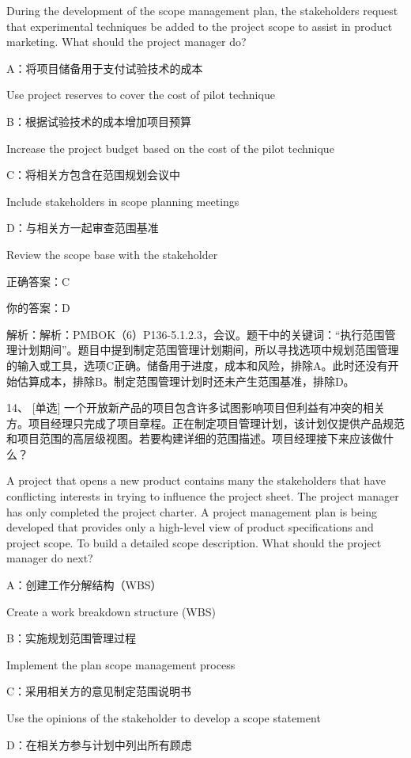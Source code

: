 During the development of the scope management plan, the stakeholders request that experimental techniques be added to the project scope to assist in product marketing. What should the project manager do?

A：将项目储备用于支付试验技术的成本

Use project reserves to cover the cost of pilot technique

B：根据试验技术的成本增加项目预算

Increase the project budget based on the cost of the pilot technique

C：将相关方包含在范围规划会议中

Include stakeholders in scope planning meetings

D：与相关方一起审查范围基准

Review the scope base with the stakeholder

正确答案：C

你的答案：D

解析：解析：PMBOK（6）P136-5.1.2.3，会议。题干中的关键词：“执行范围管理计划期间”。题目中提到制定范围管理计划期间，所以寻找选项中规划范围管理的输入或工具，选项C正确。储备用于进度，成本和风险，排除A。此时还没有开始估算成本，排除B。制定范围管理计划时还未产生范围基准，排除D。


14、 [单选] 一个开放新产品的项目包含许多试图影响项目但利益有冲突的相关方。项目经理只完成了项目章程。正在制定项目管理计划，该计划仅提供产品规范和项目范围的高层级视图。若要构建详细的范围描述。项目经理接下来应该做什么？

A project that opens a new product contains many the stakeholders that have conflicting interests in trying to influence the project sheet. The project manager has only completed the project charter. A project management plan is being developed that provides only a high-level view of product specifications and project scope. To build a detailed scope description. What should the project manager do next?

A：创建工作分解结构（WBS）

Create a work breakdown structure (WBS)

B：实施规划范围管理过程

Implement the plan scope management process

C：采用相关方的意见制定范围说明书

Use the opinions of the stakeholder to develop a scope statement

D：在相关方参与计划中列出所有顾虑

